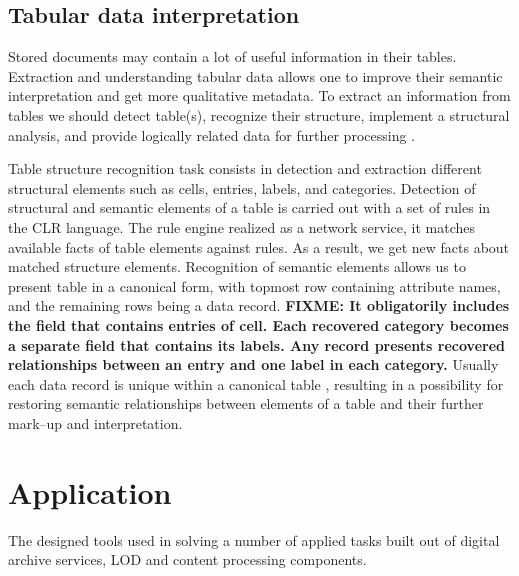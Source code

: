 \documentclass[conference,a4paper]{IEEEtran}
\begin{document}
\subsection{Tabular data interpretation}

Stored documents may contain a lot of useful information in their tables.  Extraction and understanding tabular data allows one to improve their semantic interpretation and get more qualitative metadata.  To extract an information from tables we should detect table(s), recognize their structure, implement a structural analysis, and provide logically related data for further processing \cite{Shigarov_2017}.

Table structure recognition task consists in detection and extraction different structural elements such as cells, entries, labels, and categories.  Detection of structural and semantic elements of a table is carried out with a set of rules in the CLR language.  The rule engine realized as a network service, it matches available facts of table elements against rules.  As a result, we get new facts about matched structure elements.  Recognition of semantic elements allows us to present table in a canonical form, with topmost row containing attribute names, and the remaining rows being a data record.  \textbf{FIXME: It obligatorily includes the field that contains entries of cell. Each recovered category becomes a separate field that contains its labels. Any record presents recovered relationships between an entry and one label in each category.}  Usually each data record is unique within a canonical table \cite{Shigarov_2016}, resulting in a possibility for restoring semantic relationships between elements of a table and their further mark--up and interpretation.

\section{Application}

The designed tools used in solving a number of applied tasks built out of digital archive services, LOD and content processing components.
\end{document}

